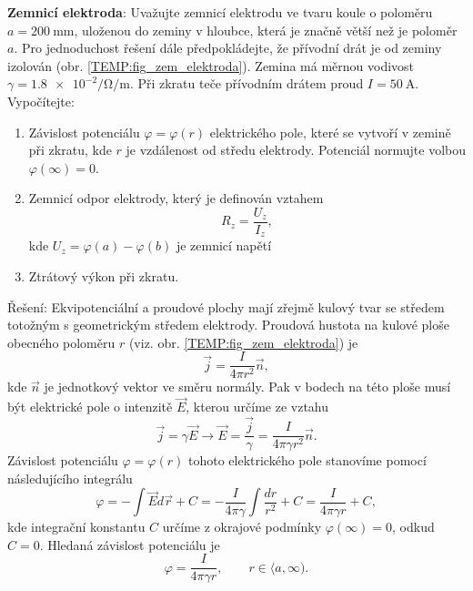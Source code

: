 \begin{example}
  \textbf{Zemnicí elektroda}: Uvažujte zemnicí elektrodu ve tvaru koule o poloměru  
  $a=\SI{200}{\mm}$, uloženou do zeminy v hloubce, která je značně větší než je poloměr $a$. Pro 
  jednoduchost řešení dále předpokládejte, že přívodní drát je od zeminy izolován (obr.
  \ref{TEMP:fig_zem_elektroda}). Zemina má měrnou vodivost $\gamma=\num[exponent-product =
  \cdot]{1,8e-2}\si{\per\ohm\per\m}$. Při zkratu teče přívodním drátem proud $I=\SI{50}{\A}$.
  Vypočítejte:
  
    
  \begin{enumerate}[label=\emph{\alph*})]
    \item Závislost potenciálu $\varphi=\varphi(r)$ elektrického pole, které se vytvoří v
          zemině při zkratu, kde $r$ je vzdálenost od středu elektrody. Potenciál normujte
          volbou $\varphi(\infty)=0$.
    \item Zemnicí odpor elektrody, který je definován vztahem $$R_z=\frac{U_z}{I_z},$$ kde
          $U_z = \varphi(a)-\varphi(b)$ je zemnicí napětí 
    \item Ztrátový výkon při zkratu.            
  \end{enumerate}
  Řešení:    
  Ekvipotenciální a proudové plochy mají zřejmě kulový tvar se středem totožným s geometrickým 
  středem elektrody. Proudová hustota na kulové ploše obecného poloměru $r$ (viz. obr. 
  \ref{TEMP:fig_zem_elektroda}) je $$\vec{j}=\frac{I}{4\pi r^2}\vec{n},$$ kde $\vec{n}$ je 
  jednotkový vektor ve směru normály. Pak v bodech na této ploše musí být elektrické pole o 
  intenzitě $\vec{E}$, kterou určíme ze vztahu
  \begin{equation*}
    \vec{j}= \gamma\vec{E}\rightarrow\vec{E}=
    \frac{\vec{j}}{\gamma}=\frac{I}{4\pi\gamma r^2}\vec{n}.
  \end{equation*}
  Závislost potenciálu $\varphi=\varphi(r)$ tohoto elektrického pole stanovíme pomocí následujícího 
  integrálu
  \begin{equation}
    \varphi = - \int\vec{E}d\vec{r}+C = -\frac{I}{4\pi\gamma}\int\frac{dr}{r^2} + C 
            =   \frac{I}{4\pi\gamma r} + C, \nonumber
  \end{equation} 
  kde integrační konstantu $C$ určíme z okrajové podmínky $\varphi(\infty)=0$, odkud $C=0$.
  Hledaná závislost potenciálu je
  \begin{equation*}
    \varphi = \frac{I}{4\pi\gamma r}, \qquad r\in\langle a, \infty). 
  \end{equation*}           
  

\end{example}

